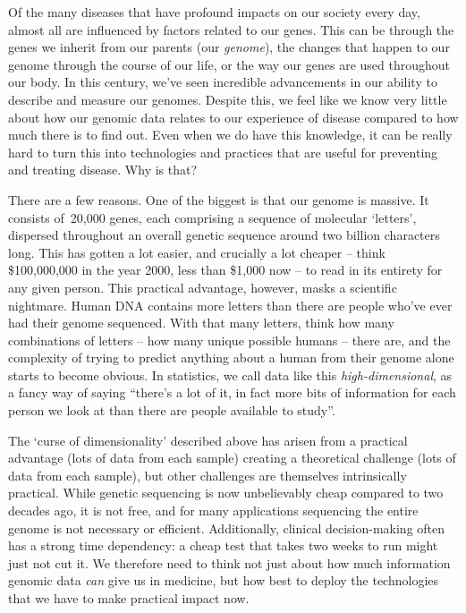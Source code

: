 \documentclass[../thesis.tex]{subfiles}
\begin{document}
Of the many diseases that have profound impacts on our society every day, almost all are influenced by factors related to our genes. This can be through the genes we inherit from our parents (our \emph{genome}), the changes that happen to our genome through the course of our life, or the way our genes are used throughout our body. In this century, we've seen incredible advancements in our ability to describe and measure our genomes. Despite this, we feel like we know very little about how our genomic data relates to our experience of disease compared to how much there is to find out. Even when we do have this knowledge, it can be really hard to turn this into technologies and practices that are useful for preventing and treating disease. Why is that?

There are a few reasons. One of the biggest is that our genome is massive. It consists of~20,000 genes, each comprising a sequence of molecular `letters', dispersed throughout an overall genetic sequence around two billion characters long. This has gotten a lot easier, and crucially a lot cheaper -- think \$100,000,000 in the year 2000, less than \$1,000 now -- to read in its entirety for any given person. This practical advantage, however, masks a scientific nightmare. Human DNA contains more letters than there are people who've ever had their genome sequenced. With that many letters, think how many combinations of letters -- how many unique possible humans -- there are, and the complexity of trying to predict anything about a human from their genome alone starts to become obvious. In statistics, we call data like this \emph{high-dimensional}, as a fancy way of saying ``there's a lot of it, in fact more bits of information for each person we look at than there are people available to study''. 

The `curse of dimensionality' described above has arisen from a practical advantage (lots of data from each sample) creating a theoretical challenge (lots of data from each sample), but other challenges are themselves intrinsically practical. While genetic sequencing is now unbelievably cheap compared to two decades ago, it is not free, and for many applications sequencing the entire genome is not necessary or efficient. Additionally, clinical decision-making often has a strong time dependency: a cheap test that takes two weeks to run might just not cut it. We therefore need to think not just about how much information genomic data \emph{can} give us in medicine, but how best to deploy the technologies that we have to make practical impact now.
\end{document}
